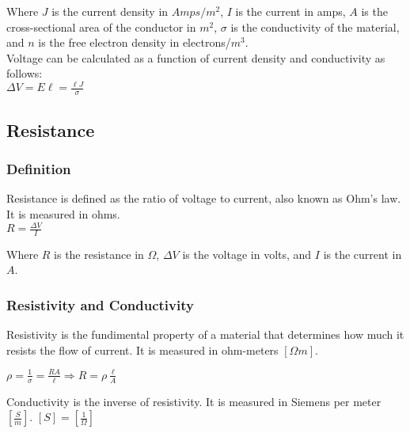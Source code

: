 Where $J$ is the current density in $Amps/m^2$, $I$ is the current in amps, $A$ is the cross-sectional 
area of the conductor in $m^2$, $\sigma$ is the conductivity of the material, and $n$ is the free electron 
density in electrons/$m^3$.\\

Voltage can be calculated as a function of current density and conductivity as follows:\\
\vbox{
    \center
    $\Delta V = E\ell = \frac{\ell J}{\sigma}$
}
\vspace{12pt}
\hrulefill

\begin{center}
\subsection*{Resistance}
\end{center}

\subsubsection*{Definition}
Resistance is defined as the ratio of voltage to current, also known as Ohm's law. It is measured in ohms.\\

\vbox{
    \center
    $R = \frac{\Delta V}{I}$
}\vspace{12pt}

Where $R$ is the resistance in $\Omega$, $\Delta V$ is the voltage in volts, and $I$ is the current in $A$.\\


\subsubsection*{Resistivity and Conductivity}

\hspace{.5cm} Resistivity is the fundimental property of a material that determines how much it resists the flow of current. 
It is measured in ohm-meters $[\Omega m]$.

\vbox {
    \center
    $\rho = \frac{1}{\sigma} = \frac{RA}{\ell} \Longrightarrow R = \rho \frac{\ell}{A}$
}

\pagebreak

\hspace{.5cm} Conductivity is the inverse of resistivity. It is measured in Siemens per meter $[\frac{S}{m}]$. $[S] = [\frac{1}{\Omega}]$\\

